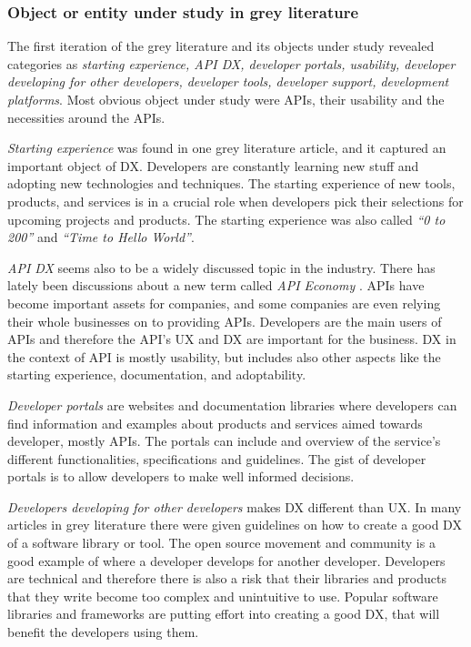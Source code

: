 \documentclass[english, 12pt, a4paper, sci, utf8, a-1b, online]{aaltothesis}
\begin{document}
\subsubsection{Object or entity under study in grey literature}

The first iteration of the grey literature and its objects under study revealed categories as \textit{starting experience, API DX, developer portals, usability, developer developing for other developers, developer tools, developer support, development platforms}. Most obvious object under study were APIs, their usability and the necessities around the APIs.

\textit{Starting experience} was found in one grey literature article, and it captured an important object of DX. Developers are constantly learning new stuff and adopting new technologies and techniques. The starting experience of new tools, products, and services is in a crucial role when developers pick their selections for upcoming projects and products. The starting experience was also called \textit{``0 to 200''} and \textit{``Time to Hello World''}.

\textit{API DX} seems also to be a widely discussed topic in the industry. There has lately been discussions about a new term called \textit{API Economy} \textcite{web-api-economy}. APIs have become important assets for companies, and some companies are even relying their whole businesses on to providing APIs. Developers are the main users of APIs and therefore the API's UX and DX are important for the business. DX in the context of API is mostly usability, but includes also other aspects like the starting experience, documentation, and adoptability.

\textit{Developer portals} are websites and documentation libraries where developers can find information and examples about products and services aimed towards developer, mostly APIs. The portals can include and overview of the service's different functionalities, specifications and guidelines. The gist of developer portals is to allow developers to make well informed decisions.

\textit{Developers developing for other developers} makes DX different than UX. In many articles in grey literature there were given guidelines on how to create a good DX of a software library or tool. The open source movement and community is a good example of where a developer develops for another developer. Developers are technical and therefore there is also a risk that their libraries and products that they write become too complex and unintuitive to use. Popular software libraries and frameworks are putting effort into creating a good DX, that will benefit the developers using them.
\end{document}
